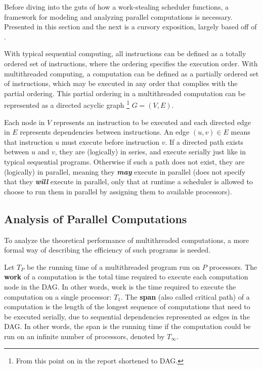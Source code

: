 \documentclass[bsc,frontabs,singlespacing,parskip,deptreport,normalheadings]{infthesis}
\begin{document}
Before diving into the guts of how a work-stealing scheduler functions, a
framework for modeling and analyzing parallel computations is necessary.
Presented in this section and the next is a cursory exposition, largely based
off of \cite{cormen_introduction_2009, herlihy_art_2012,
blumofe_executing_1995}.

With typical sequential computing, all instructions can be defined as a
totally ordered set of instructions, where the ordering specifies the
execution order. With multithreaded computing, a computation can be defined
as a partially ordered set of instructions, which may be executed in any
order that complies with the partial ordering. This partial ordering in a
multithreaded computation can be represented as a directed acyclic graph
\footnote{From this point on in the report shortened to DAG.} \(G = (V, E)\).

Each node in \(V\) represents an instruction to be executed and each directed
edge in \(E\) represents dependencies between instructions. An edge \((u,v) \in
E\) means that instruction \(u\) must execute before instruction \(v\). If a
directed path exists between \(u\) and \(v\), they are (logically) in series,
and execute serially just like in typical sequential programs. Otherwise if such
a path does not exist, they are (logically) in parallel, meaning they
\textit{\textbf{may}} execute in parallel (does not specify that they
\textit{\textbf{will}} execute in parallel, only that at runtime a scheduler is
allowed to choose to run them in parallel by assigning them to available
processors).

\subsection{Analysis of Parallel Computations}
\label{subsection:analysis_of_parallel_computations}

To analyze the theoretical performance of multithreaded computations, a more
formal way of describing the efficiency of such programs is needed.

Let \(T_P\) be the running time of a multithreaded program run on \(P\)
processors. The \textbf{work} of a computation is the total time required to
execute each computation node in the DAG. In other words, work is the time
required to execute the computation on a single processor: \(T_1\). The
\textbf{span} (also called critical path) of a computation is the length of the
longest sequence of computations that need to be executed serially, due to
sequential dependencies represented as edges in the DAG. In other words, the
span is the running time if the computation could be run on an infinite number
of processors, denoted by \(T_\infty\).
\end{document}
